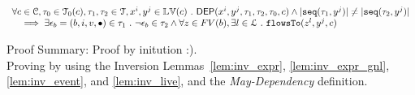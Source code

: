\begin{lem}
	\label{lem:diffctl_inv}
	\[
		\begin{array}{l}
			\forall c \in \mathcal{C}, \mathtt{\tau}_0 \in \mathcal{T}_0(c), \mathtt{\tau}_1, \mathtt{\tau}_2 \in \mathcal{T}, x^i, y^j \in \mathbb{LV}(c) ~.~ 
		\mathsf{DEP}(x^i, y^j, \mathtt{\tau}_1, \mathtt{\tau}_2 , \mathtt{\tau}_0, c) \land
		|\mathtt{seq}(\mathtt{\tau}_1, y^j)| \neq |\mathtt{seq}(\mathtt{\tau}_2, y^j)|
		\\ \quad  \implies
		\exists \mathtt{\epsilon}_b = (b, i, v, \bullet) \in \mathtt{\tau}_1 ~.~ \neg \mathtt{\epsilon}_b \in \mathtt{\tau}_2
		\land 
		\forall z \in FV(b), \exists l \in \mathcal{L} ~.~ \mathtt{flowsTo}(z^l, y^j, c)
	\end{array}
	\]
\end{lem} 
Proof Summary: 	Proof by initution :).
\\
Proving by using the Inversion Lemmas~\ref{lem:inv_expr}, \ref{lem:inv_expr_gnl}, 
\ref{lem:inv_event}, and \ref{lem:inv_live}, and the \emph{May-Dependency} definition.
%
